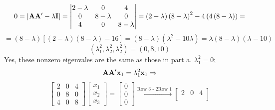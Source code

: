 \begin{enumerate}[font=\bfseries]
\begin{enumerate}
            \[
                0 = \left|\bold{A}\bold{A}^\prime - \lambda\bold{I}\right|
                =
                \left|
                \begin{matrix}
                    2 - \lambda & 0 & 4 \\
                    0 & 8 - \lambda & 0 \\
                    4 & 0 & 8 - \lambda
                \end{matrix}
                \right|
                =
                \left(2 - \lambda\right){\left(8 - \lambda\right)}^2 - 4\left(4\left(8 - \lambda\right)\right)
                =
            \]
            \[
                =
                \left(8 - \lambda\right)
                \left[\left(2 - \lambda\right){\left(8 - \lambda\right)} - 16\right]
                =
                \left(8 - \lambda\right)
                \left(\lambda^2 - 10\lambda\right)
                =
                \lambda\left(8 - \lambda\right)\left(\lambda - 10\right)
            \]
            \[
                \left(\lambda_1^2, \lambda_2^2, \lambda_2^2\right)
                =
                \left(0, 8, 10\right)
            \]
            Yes, these nonzero eigenvales are the same as those in part a.
            \newline
            \underline{$\lambda_1^2 = 0$:}
            \[
                \bold{A}\bold{A}^\prime\bold{x}_1=\lambda_1^2\bold{x}_1
                \Rightarrow
            \]
            \[
                \begin{bmatrix}
                    2 & 0 & 4 \\
                    0 & 8 & 0 \\
                    4 & 0 & 8
                \end{bmatrix}
                \begin{bmatrix}
                    x_1 \\
                    x_2 \\
                    x_3
                \end{bmatrix}
                =
                \begin{bmatrix}
                    0 \\
                    0 \\
                    0
                \end{bmatrix}
                \overset{\text{Row 3 - 2Row 1}}{\longrightarrow}
                \begin{bmatrix}
                    2 & 0 & 4 \\

\end{bmatrix}\]
\end{enumerate}
\end{enumerate}
